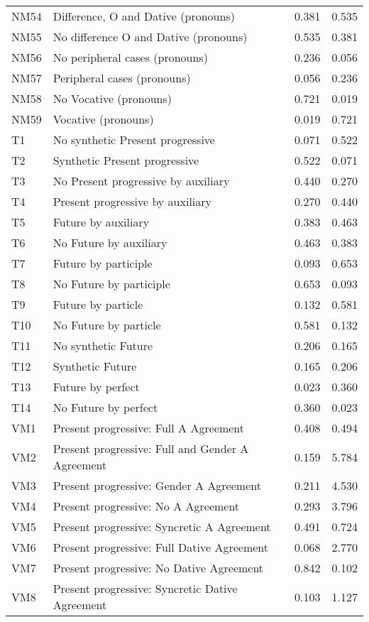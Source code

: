 \begin{longtable}{llll}
NM54 & Difference, O and Dative (pronouns) & 0.381 & 0.535\\
NM55 & No difference O and Dative (pronouns) & 0.535 & 0.381\\
NM56 & No peripheral cases (pronouns) & 0.236 & 0.056\\
NM57 & Peripheral cases (pronouns) & 0.056 & 0.236\\
NM58 & No Vocative (pronouns) & 0.721 & 0.019\\
NM59 & Vocative (pronouns) & 0.019 & 0.721\\
T1 & No synthetic Present progressive & 0.071 & 0.522\\
T2 & Synthetic Present progressive & 0.522 & 0.071\\
T3 & No Present progressive by auxiliary & 0.440 & 0.270\\
T4 & Present progressive by auxiliary & 0.270 & 0.440\\
T5 & Future by auxiliary & 0.383 & 0.463\\
T6 & No Future by auxiliary & 0.463 & 0.383\\
T7 & Future by participle & 0.093 & 0.653\\
T8 & No Future by participle & 0.653 & 0.093\\
T9 & Future by particle & 0.132 & 0.581\\
T10 & No Future by particle & 0.581 & 0.132\\
T11 & No synthetic Future & 0.206 & 0.165\\
T12 & Synthetic Future & 0.165 & 0.206\\
T13 & Future by perfect & 0.023 & 0.360\\
T14 & No Future by perfect & 0.360 & 0.023\\
VM1 & Present progressive: Full A Agreement & 0.408 & 0.494\\
VM2 & Present progressive: Full and Gender A Agreement & 0.159 & 5.784\\
VM3 & Present progressive: Gender A Agreement & 0.211 & 4.530\\
VM4 & Present progressive: No A Agreement & 0.293 & 3.796\\
VM5 & Present progressive: Syncretic A Agreement & 0.491 & 0.724\\
VM6 & Present progressive: Full Dative Agreement & 0.068 & 2.770\\
VM7 & Present progressive: No Dative Agreement & 0.842 & 0.102\\
VM8 & Present progressive: Syncretic Dative Agreement & 0.103 & 1.127\\

\end{longtable}
